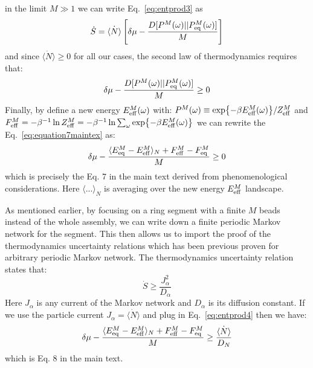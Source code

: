 \documentclass[amsmath,preprintnumbers,10pt,nofootinbib,prl,twocolumn]{revtex4-1}
\begin{document}
in the limit $M\gg 1$
we can write Eq.~\ref{eq:entprod3} as 
\begin{equation}
\label{eq:entprod4}
    \dot{S}=\dot{\langle N\rangle}\left[\delta \mu -\frac{D[P^{M}(\omega)|| P_{\rm eq}^{M}(\omega)]}{M}\right]
\end{equation}
and since $\dot{\langle N\rangle}\geq 0$ for all our cases, the second law of thermodynamics requires that:
\begin{equation}
\label{eq:equation7maintex}
    \delta \mu -\frac{D[P^{M}(\omega)|| P_{\rm eq}^{M}(\omega)]}{M}\geq 0
\end{equation}
Finally, by define a new energy $E_{\rm{eff}}^M(\omega)$ with: $P^M(\omega)\equiv\exp{-\beta E_{\rm{eff}}^M(\omega)}/Z^M_{\rm{eff}}$ and $F^M_{\rm{eff}}=-\beta^{-1} \ln Z^M_{\rm{eff}} = -\beta^{-1}\ln \sum_\omega \exp{-\beta E_{\rm{eff}}^M(\omega)}$ we can rewrite the Eq.~\ref{eq:equation7maintex} as:
\begin{equation}
\label{eq:equation7maintex2}
    \delta \mu -\frac{\langle E^M_{\rm{eq}}-E^M_{\rm{eff}}\rangle_N+F^M_{\rm{eff}}-F^M_{\rm{eq}}}{M}\geq 0
\end{equation}
which is precisely the Eq. 7 in the main text derived from phenomenological considerations. Here $\langle... \rangle_N$ is averaging over the new energy $E_{\rm{eff}}^M$ landscape.

As mentioned earlier, by focusing on a ring segment with a finite $M$ beads instead of the whole assembly, we can write down a finite periodic Markov network for the segment. This then allows us to import the proof of the thermodynamics uncertainty relations which has been previous proven for arbitrary periodic Markov network. The thermodynamics uncertainty relation states that:
\begin{equation}
\label{eq:thermodynamicsuncertaintyrelation}
    \dot{S}\geq\frac{J_\alpha^2}{D_\alpha}
\end{equation}
Here $J_\alpha$ is any current of the Markov network and $D_\alpha$ is its diffusion constant. If we use the particle current $J_\alpha=\dot{\langle N \rangle}$ and plug in Eq.~\ref{eq:entprod4} then we have:
\begin{equation}
\label{eq:equation8maintext}
    \delta \mu -\frac{\langle E^M_{\rm{eq}}-E^M_{\rm{eff}}\rangle_N+F^M_{\rm{eff}}-F^M_{\rm{eq}}}{M}\geq \frac{\dot{\langle N \rangle}}{D_N}
\end{equation}
which is Eq. 8 in the main text.
%
\end{document}
